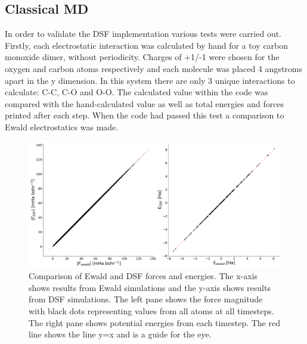 \subsection{Classical MD}
\label{sect:ClassicalMDEwald}
In order to validate the DSF implementation various tests were carried out. Firstly, each electrostatic interaction was calculated by hand for a toy carbon monoxide dimer, without periodicity. Charges of +1/-1 were chosen for the oxygen and carbon atoms respectively and each molecule was placed 4 angstroms apart in the y dimension. In this system there are only 3 unique interactions to calculate: C-C, C-O and O-O. The calculated value within the code was compared with the hand-calculated value as well as total energies and forces printed after each step. When the code had passed this test a comparison to Ewald electrostatics was made.
\\
\begin{figure}[ht]
  \includegraphics[width=\textwidth]{./img/ES/Ewald_DSF_Classical.png}
  \caption{\label{fig:Classical_DSF_Ewald}Comparison of Ewald and DSF forces and energies. The x-axis shows results from Ewald simulations and the y-axis shows results from DSF simulations. The left pane shows the force magnitude with black dots representing values from all atoms at all timesteps. The right pane shows potential energies from each timestep. The red line shows the line y=x and is a guide for the eye.}
\end{figure}
\\
